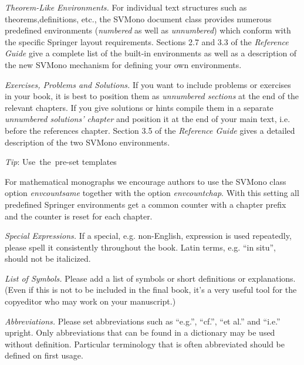 \documentclass[graybox]{svmono}
\begin{document}
 {\it Theorem-Like Environments.} For individual text structures such as theorems,\break definitions, etc., the {\sc SVMono} document class provides numerous predefined environments ({\it numbered} as well as {\it unnumbered}) which conform with the specific Springer layout requirements. Sections 2.7 and 3.3 of the {\it Reference Guide} give a complete list of the built-in environments as well as a description of the new {\sc SVMono} mechanism for defining your own environments.

{\it Exercises, Problems and Solutions.} If you want to include problems or exercises in your book, it is best to position them as {\it unnumbered sections} at the end of the relevant chapters. If you give solutions or hints compile them in a separate {\it unnumbered solutions' chapter} and position it at the end of your main text, i.e. before the references chapter. Section 3.5 of the {\it Reference Guide} gives a detailed description of the two {\sc SVMono} environments.

\vspace*{-6pc}

\hspace*{29pc}\hbox{{\it Tip}:}
\hspace*{29pc}\hbox{Use the pre-set}
\hspace*{29pc}\hbox{templates}

\vspace*{2pc}

For mathematical monographs we encourage authors to use the {\sc SVMono} class option {\it envcountsame} together with the option {\it envcountchap}. With this setting all predefined Springer environments get a common counter with a chapter prefix and the counter is reset for each chapter.

{\it Special Expressions.} If a special, e.g. non-English, expression is used repeatedly, please spell it consistently throughout the book. Latin terms, e.g. ``in situ'', should not be italicized.

{\it List of Symbols.} Please add a list of symbols or short definitions or explanations. (Even if this is not to be included in the final book, it's a very useful tool for the copyeditor who may work on your manuscript.)

{\it Abbreviations.} Please set abbreviations such as ``e.g.'', ``cf.'', ``et al.'' and ``i.e.'' upright. Only abbreviations that can be found in a dictionary may be used without definition. Particular terminology that is often abbreviated should be defined on first usage.
\end{document}
